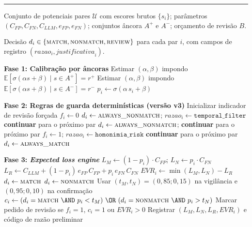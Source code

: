 \noindent\rule{\textwidth}{0.4pt}
\begin{algorithmic}[1]

\REQUIRE \parbox[t]{0.85\linewidth}{Conjunto de potenciais pares $\mathcal{U}$ com escores brutos $\{s_i\}$;
  parâmetros $(C_{FP}, C_{FN}, C_{LLM}, e_{FP}, e_{FN})$;
  conjuntos âncora $A^+$ e $A^-$; orçamento de revisão $B$.}
\ENSURE \parbox[t]{0.85\linewidth}{Decisão $d_i \in \{\textsc{match}, \textsc{nonmatch}, \textsc{review}\}$ para cada par $i$,
  com campos de registro $(\mathit{razao}_i, \mathit{justificativa}_i)$.}

\medskip
\STATE \textbf{Fase 1: Calibração por âncoras}
\STATE Estimar $(\alpha,\beta)$ impondo $\mathbb{E}[\sigma(\alpha s + \beta) \mid s \in A^+] = r^+$
\STATE Estimar $(\alpha,\beta)$ impondo $\mathbb{E}[\sigma(\alpha s + \beta) \mid s \in A^-] = r^-$
    \STATE $p_i \leftarrow \sigma(\alpha\, s_i + \beta)$
\ENDFOR

\medskip
\STATE \textbf{Fase 2: Regras de guarda determinísticas (versão v3)}
    \STATE Inicializar indicador de revisão forçada $f_i \leftarrow 0$
        \STATE $d_i \leftarrow \textsc{always\_nonmatch}$; \quad $\mathit{razao}_i \leftarrow \texttt{temporal\_filter}$
        \STATE \textbf{continuar} para o próximo par
    \ENDIF
        \STATE $d_i \leftarrow \textsc{always\_nonmatch}$; \quad \textbf{continuar} para o próximo par
    \ENDIF
        \STATE $f_i \leftarrow 1$; \quad $\mathit{razao}_i \leftarrow \texttt{homonimia\_risk}$ 
        \STATE \textbf{continuar} para o próximo par
    \ENDIF
        \STATE $d_i \leftarrow \textsc{always\_match}$ 
    \ENDIF
\ENDFOR

\medskip
\STATE \textbf{Fase 3: \textit{Expected loss engine}}
    \STATE $L_M \leftarrow (1-p_i)\cdot C_{FP}$; \quad $L_N \leftarrow p_i\cdot C_{FN}$
    \STATE $L_R \leftarrow C_{LLM} + (1-p_i)\,e_{FP}\,C_{FP} + p_i\,e_{FN}\,C_{FN}$
    \STATE $\mathit{EVR}_i \leftarrow \min(L_M, L_N) - L_R$ 
        \STATE $d_i \leftarrow \textsc{match}$
    \ELSE
        \STATE $d_i \leftarrow \textsc{nonmatch}$
    \ENDIF
    \STATE Usar $(t_M,t_N)=(0{,}85;0{,}15)$ na vigilância e $(0{,}95;0{,}10)$ na confirmação
    \STATE $c_i \leftarrow (d_i=\textsc{match}\ \AND\ p_i<t_M)\ \OR\ (d_i=\textsc{nonmatch}\ \AND\ p_i>t_N)$
    \STATE Marcar pedido de revisão se $f_i=1$, $c_i=1$ ou $\mathit{EVR}_i>0$
    \STATE Registrar $(L_M, L_N, L_R, \mathit{EVR}_i)$ e código de razão preliminar
\ENDFOR


\end{algorithmic}

